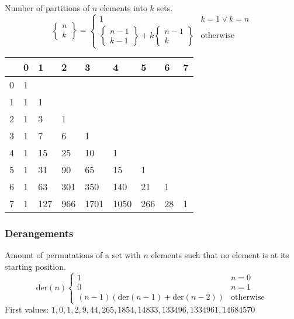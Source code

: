 Number of partitions of $n$ elements into $k$ sets.
\begin{equation*}
  \begin{Bmatrix}
    n\\k
  \end{Bmatrix} =
  \begin{cases}
    1 & k = 1 \lor k = n\\
    \left\{
      \begin{smallmatrix}
        n - 1\\k - 1
      \end{smallmatrix}
\right\} + k \left\{
  \begin{smallmatrix}
    n - 1\\k
  \end{smallmatrix}
\right\} & \text{otherwise}
  \end{cases}
\end{equation*}
\begin{center}
	\begin{tabular}{ |l||l|l|l|l|l|l|l|l| } 
		\hline
		\diagbox{$n$}{$k$} & 0 & 1 & 2 & 3 & 4 & 5 & 6 & 7  \\
		\hline\hline
		0 &  1 &     &     &      &      &     &     &  \\
		1 &  1 & 1   &     &      &      &     &     &  \\
		2 &  1 & 3   & 1   &      &      &     &     &  \\
		3 &  1 & 7   & 6   & 1    &      &     &     &  \\
		4 &  1 & 15  & 25  & 10   & 1    &     &     &  \\
		5 &  1 & 31  & 90  & 65   & 15   & 1   &     &  \\
		6 &  1 & 63  & 301 & 350  & 140  & 21  & 1   &  \\
		7 &  1 & 127 & 966 & 1701 & 1050 & 266 & 28 & 1 \\
		\hline
	\end{tabular}
\end{center}

\subsubsection{Derangements}
Amount of permutations of a set with $n$ elements such that no element
is at its starting position.
\begin{equation*}
  \text{der}(n)
  \begin{cases}
    1 & n = 0\\
    0 & n = 1\\
    (n - 1)(\text{der}(n - 1) + \text{der}(n - 2)) & \text{otherwise}
  \end{cases}
\end{equation*}
First values: $1, 0, 1, 2, 9, 44, 265, 1854, 14833, 133496, 1334961, 14684570$

